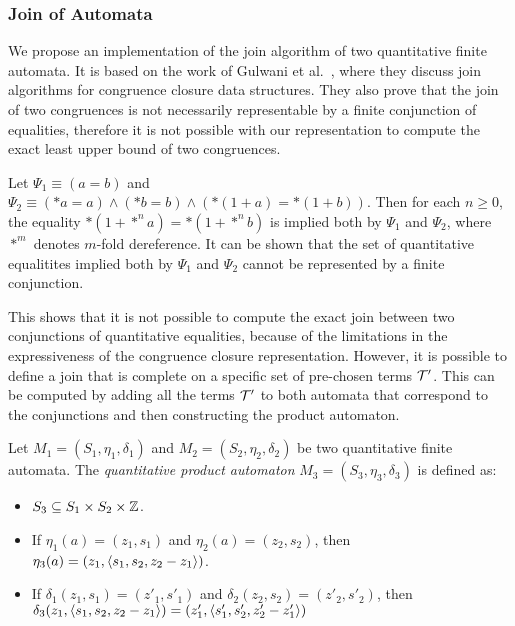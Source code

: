 \subsubsection{Join of Automata}

We propose an implementation of the join algorithm of two quantitative finite automata.
It is based on the work of Gulwani et al.~\cite{join}, where they discuss join algorithms for congruence closure data structures.
They also prove that the join of two congruences is not necessarily representable by a finite conjunction of equalities, therefore it is not possible with our representation to compute the exact least upper bound of two congruences.

\begin{example}\label{example:infinite-join}
    Let $\Psi_1 \equiv (a = b)$ and $\Psi_2 \equiv (*a = a)\land (*b=b) \land (*(1 + a) = *(1 + b))$. Then for each $n \geq 0$, the equality $*(1+*^n a) = *(1 + *^n b)$ is implied both by $\Psi_1$ and $\Psi_2$, where $*^m$ denotes $m$-fold dereference.
    It can be shown that the set of quantitative equalitites implied both by $\Psi_1$ and $\Psi_2$ cannot be represented by a finite conjunction\cite{join, 2pointer}.
\end{example}

This shows that it is not possible to compute the exact join between two conjunctions of quantitative equalities, because of the limitations in the expressiveness of the congruence closure representation.
However, it is possible to define a join that is complete on  a specific set of pre-chosen terms $\mathcal{T}'$.
This can be computed by adding all the terms $\mathcal{T}'$ to both automata that correspond to the conjunctions and then constructing the product automaton.

\begin{definition}
    Let $M_1 = (S_1,\eta_1,\delta_1)$ and $M_2 = (S_2, \eta_2,\delta_2)$ be two quantitative finite automata. The \emph{quantitative product automaton} $M_3 = (S_3, \eta_3, \delta_3)$ is defined as:
    \begin{itemize}
        \item $S_3 \subseteq S_1 \times S_2 \times \mathbb{Z}$.
        \item If $\eta_1(a) = (z_1, s_1)$ and $\eta_2(a) = (z_2, s_2)$, then
              $\eta_3(a) = (z_1, \langle s_1, s_2, z_2-z_1\rangle)$.
        \item If $\delta_1(z_1, s_1) = (z'_1, s'_1)$ and $\delta_2(z_2, s_2) = (z'_2, s'_2)$, then $\delta_3(z_1, \langle s_1, s_2, z_2 - z_1\rangle) =  (z'_1, \langle s'_1, s'_2, z'_2 -z'_1\rangle)$
    \end{itemize}
\end{definition}

